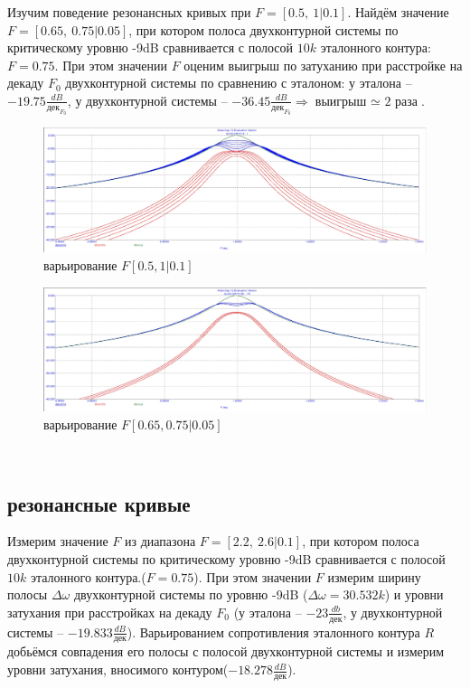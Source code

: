 \documentclass[a4paper, 14pt]{extarticle}%
\begin{document}
Изучим поведение резонансных кривых при $F = [0.5,~1|0.1]$. Найдём значение $F = [0.65,~0.75|0.05]$, при котором полоса двухконтурной системы по критическому уровню -9dB сравнивается с полосой $10k$ эталонного контура: $F = 0.75$. При этом значении $F$ оценим выигрыш по затуханию при расстройке на декаду $F_0$ двухконтурной системы по сравнению с эталоном: у эталона -- $-19.75\frac{dB}{\text{дек}_{F_0}}$, у двухконтурной системы -- $-36.45\frac{dB}{\text{дек}_{F_0}} \Longrightarrow \text{выигрыш $\simeq$ 2 раза}$.

\begin{figure}[h!]
	\centering
			\includegraphics[width=1.1\linewidth]{1.6varF1.jpg}
            \caption{варьирование $F [0.5, 1|0.1]$}
	\label{A}
\end{figure}

\begin{figure}[h!]
	\centering
			\includegraphics[width=1.1\linewidth]{1.6varF2.jpg}
            \caption{варьирование $F [0.65, 0.75|0.05]$}
	\label{A}
\end{figure}

~

\subsection{резонансные кривые}

Измерим значение $F$ из диапазона $F = [2.2,~2.6|0.1]$, при котором полоса двухконтурной системы по критическому уровню -9dB сравнивается с полосой $10k$ эталонного контура.($F = 0.75$). При этом значении $F$ измерим ширину полосы $\Delta \omega$ двухконтурной системы по уровню -9dB ($\Delta \omega = 30.532k$) и уровни затухания при расстройках на декаду $F_0$ (у эталона -- $-23\frac{db}{\text{дек}}$, у двухконтурной системы -- $-19.833\frac{dB}{\text{дек}}$). Варьированием сопротивления эталонного контура $R$ добьёмся совпадения его полосы с полосой двухконтурной системы и измерим уровни затухания, вносимого контуром($-18.278\frac{dB}{\text{дек}}$).
\end{document}
